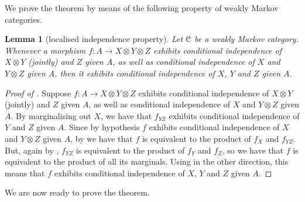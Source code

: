 \documentclass[a4paper,UKenglish,numberwithinsect,cleveref, autoref, thm-restate]{lipics-v2021}
\theoremstyle{plain} %
\newtheorem{mylemma}[mytheorem]{Lemma}
\theoremstyle{definition} %
\begin{document}
We prove the theorem by means of the following property of weakly Markov categories.

\begin{mylemma}[localised independence property]\label{local}
 Let $\mathcal{C}$ be a weakly Markov category. Whenever a morphism  $f:A\to X\otimes Y\otimes Z$ exhibits conditional independence of $X\otimes Y$ (jointly) and $Z$ given $A$, as well as conditional independence of $X$ and $Y\otimes Z$ given $A$, then it exhibits conditional independence of $X$, $Y$ and $Z$ given $A$. 
\end{mylemma}
\begin{proof}[Proof of ]
 Suppose $f:A\to X\otimes Y\otimes Z$ exhibits conditional independence of $X\otimes Y$ (jointly) and $Z$ given $A$, as well as conditional independence of $X$ and $Y\otimes Z$ given $A$.
 By marginalising out $X$, we have that $f_{YZ}$ exhibits conditional independence of $Y$ and $Z$ given $A$. 
 Since by hypothesis $f$ exhibits conditional independence of $X$ and $Y\otimes Z$ given $A$, by  we have that $f$ is equivalent to the product  of $f_X$ and $f_{YZ}$. But, again by , $f_{YZ}$ is equivalent to the product of $f_Y$ and $f_Z$, so we have that $f$ is equivalent to the product of all its marginals. Using  in the other direction, this means that $f$ exhibits conditional independence of $X$, $Y$ and $Z$ given $A$. 
\end{proof}
%
We are now ready to prove the theorem.
\end{document}
